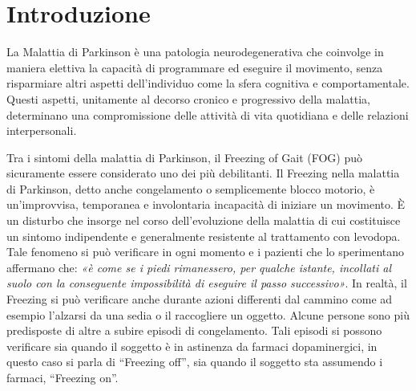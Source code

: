 


\chapter{Introduzione}\label{cap1:Introduzione}

La Malattia di Parkinson è una patologia neurodegenerativa che coinvolge in maniera elettiva la capacità di programmare ed eseguire il movimento, senza risparmiare altri aspetti dell’individuo come la sfera cognitiva e comportamentale. Questi aspetti, unitamente al decorso cronico e progressivo della malattia, determinano una compromissione delle attività di vita quotidiana e delle relazioni interpersonali.

Tra i sintomi della malattia di Parkinson, il Freezing of Gait (FOG) può sicuramente essere considerato uno dei più debilitanti. Il Freezing nella malattia di Parkinson, detto anche congelamento o semplicemente blocco motorio, è un’improvvisa, temporanea e involontaria incapacità di iniziare un movimento. È un disturbo che insorge nel corso dell’evoluzione della malattia di cui costituisce un sintomo indipendente e generalmente resistente al trattamento con levodopa. Tale fenomeno si può verificare in ogni momento e i pazienti che lo sperimentano affermano che: \textit{«è come se i piedi rimanessero, per qualche istante, incollati al suolo con la conseguente impossibilità di eseguire il passo successivo»}. In realtà, il Freezing si può verificare anche durante azioni differenti dal cammino come ad esempio l’alzarsi da una sedia o il raccogliere un oggetto. Alcune persone sono più predisposte di altre a subire episodi di congelamento. Tali episodi si possono verificare sia quando il soggetto è in astinenza da farmaci dopaminergici, in questo caso si parla di “Freezing off”, sia quando il soggetto sta assumendo i farmaci, “Freezing on”. \\

